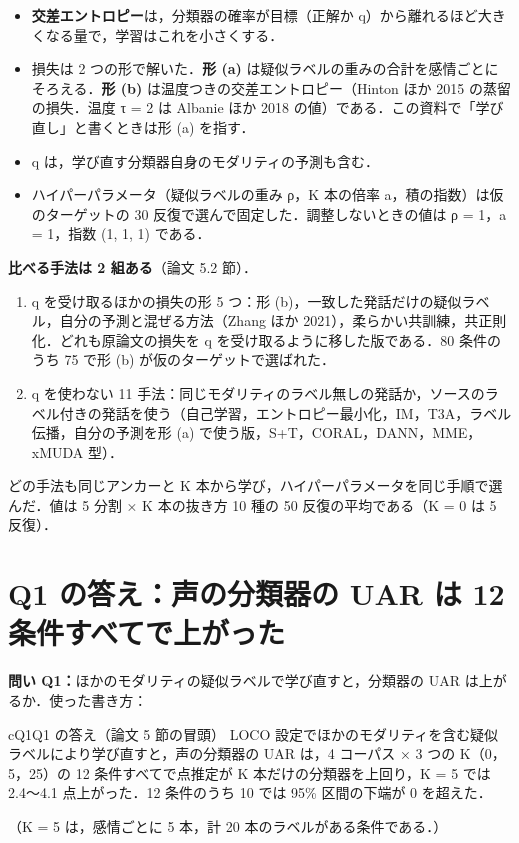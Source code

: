 \documentclass[a4paper,10pt]{ltjsarticle}
\newcommand{\toihead}[4][]{\begin{headbar}[#2]\textbf{\textcolor{#2}{問い #3：}}#4\if\relax\detokenize{#1}\relax\else\hfill{\small 使った書き方：}#1\fi\end{headbar}}
\newcommand{\pagesection}[1]{\clearpage\section{#1}}
\begin{document}
\begin{itemize}
  \item \textbf{交差エントロピー}は，分類器の確率が目標（正解か q）から離れるほど大きくなる量で，学習はこれを小さくする．
  \item 損失は 2 つの形で解いた．\textbf{形 (a)} は疑似ラベルの重みの合計を感情ごとにそろえる．\textbf{形 (b)} は温度つきの交差エントロピー（Hinton ほか 2015 の蒸留の損失．温度 τ = 2 は Albanie ほか 2018 の値）である．この資料で「学び直し」と書くときは形 (a) を指す．
  \item q は，学び直す分類器自身のモダリティの予測も含む．
  \item ハイパーパラメータ（疑似ラベルの重み ρ，K 本の倍率 a，積の指数）は仮のターゲットの 30 反復で選んで固定した．調整しないときの値は ρ = 1，a = 1，指数 (1, 1, 1) である．
\end{itemize}

\noindent\textbf{比べる手法は 2 組ある}（論文 5.2 節）．
\begin{enumerate}
  \item q を受け取るほかの損失の形 5 つ：形 (b)，一致した発話だけの疑似ラベル，自分の予測と混ぜる方法（Zhang ほか 2021），柔らかい共訓練，共正則化．どれも原論文の損失を q を受け取るように移した版である．80 条件のうち 75 で形 (b) が仮のターゲットで選ばれた．
  \item q を使わない 11 手法：同じモダリティのラベル無しの発話か，ソースのラベル付きの発話を使う（自己学習，エントロピー最小化，IM，T3A，ラベル伝播，自分の予測を形 (a) で使う版，S+T，CORAL，DANN，MME，xMUDA 型）．
\end{enumerate}
\noindent どの手法も同じアンカーと K 本から学び，ハイパーパラメータを同じ手順で選んだ．値は 5 分割 × K 本の抜き方 10 種の 50 反復の平均である（K = 0 は 5 反復）．

\pagesection{Q1 の答え：声の分類器の UAR は 12 条件すべてで上がった}\label{sec:q1ans}
\toihead{cQ1}{Q1}{ほかのモダリティの疑似ラベルで学び直すと，分類器の UAR は上がるか．}
\begin{kotae}{cQ1}{Q1 の答え（論文 5 節の冒頭）}
LOCO 設定でほかのモダリティを含む疑似ラベルにより学び直すと，声の分類器の UAR は，4 コーパス × 3 つの K（0，5，25）の 12 条件すべてで点推定が K 本だけの分類器を上回り，K = 5 では 2.4〜4.1 点上がった．12 条件のうち 10 では 95\% 区間の下端が 0 を超えた．\par
{\small（K = 5 は，感情ごとに 5 本，計 20 本のラベルがある条件である．）}
\end{kotae}
\end{document}
